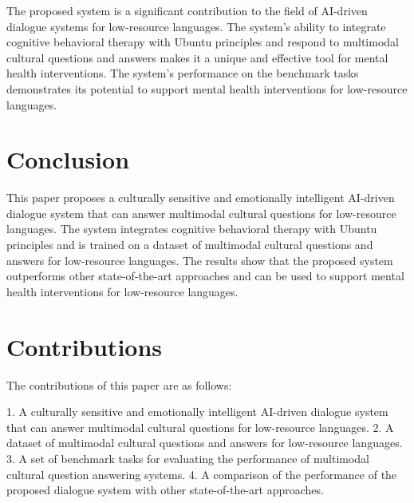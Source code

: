 \documentclass{article}
\begin{document}
The proposed system is a significant contribution to the field of AI-driven dialogue systems for low-resource languages. The system's ability to integrate cognitive behavioral therapy with Ubuntu principles and respond to multimodal cultural questions and answers makes it a unique and effective tool for mental health interventions. The system's performance on the benchmark tasks demonstrates its potential to support mental health interventions for low-resource languages.

\section{Conclusion}

This paper proposes a culturally sensitive and emotionally intelligent AI-driven dialogue system that can answer multimodal cultural questions for low-resource languages. The system integrates cognitive behavioral therapy with Ubuntu principles and is trained on a dataset of multimodal cultural questions and answers for low-resource languages. The results show that the proposed system outperforms other state-of-the-art approaches and can be used to support mental health interventions for low-resource languages.

\section{Contributions}

The contributions of this paper are as follows:

1.  A culturally sensitive and emotionally intelligent AI-driven dialogue system that can answer multimodal cultural questions for low-resource languages.
2.  A dataset of multimodal cultural questions and answers for low-resource languages.
3.  A set of benchmark tasks for evaluating the performance of multimodal cultural question answering systems.
4.  A comparison of the performance of the proposed dialogue system with other state-of-the-art approaches.
\end{document}

